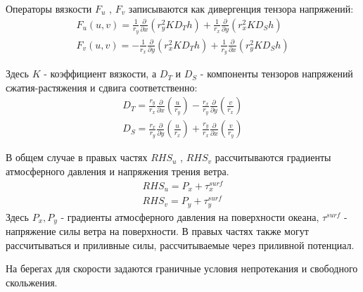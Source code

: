 Операторы вязкости $F_u$ , $F_v$ записываются как дивергенция тензора напряжений:
\begin{equation} \label{eq:ch1/sec1/3}
    \begin{array}{c}
        \displaystyle{F_{u} (u,v)=\frac{1}{r_{y} } \frac{\partial }{\partial x} \left(r_{y} ^{2} KD_{T} h\right)+\frac{1}{r_{x} } \frac{\partial }{\partial y} \left(r_{x} ^{2} KD_{S} h\right)} \\

        \displaystyle{F_{v} (u,v)=-\frac{1}{r_{x} } \frac{\partial }{\partial y} \left(r_{x} ^{2} KD_{T} h\right)+\frac{1}{r_{y} } \frac{\partial }{\partial x} \left(r_{y} ^{2} KD_{S} h\right)}
    \end{array}
\end{equation}

Здесь $\textit{K}$ - коэффициент вязкости, а $D_T$ и $D_S$ - компоненты тензоров напряжений сжатия-растяжения и сдвига соответственно:
\begin{equation} \label{eq:ch1/sec1/4}
    \begin{array}{c}
        \displaystyle{D_{T} =\frac{r_{y} }{r_{x} } \frac{\partial }{\partial x} \left(\frac{u}{r_{y} } \right)-\frac{r_{x} }{r_{y} } \frac{\partial }{\partial y} \left(\frac{v}{r_{x} } \right)} \\

        \displaystyle{D_{S} =\frac{r_{x} }{r_{y} } \frac{\partial }{\partial y} \left(\frac{u}{r_{x} } \right)+\frac{r_{y} }{r_{x} } \frac{\partial }{\partial x} \left(\frac{v}{r_{y} } \right)}
    \end{array}
\end{equation}

В общем случае в правых частях $RHS_u$ , $RHS_v$ рассчитываются градиенты атмосферного
давления и напряжения трения ветра. 
\begin{equation} \label{eq:ch1/sec1/5}
\begin{array}{c} 
\displaystyle{RHS_u = P_{x} + \tau _{x}^{surf}} \\ 

\displaystyle{RHS_v = P_{y} + \tau _{y}^{surf}} 
\end{array} 
\end{equation} 
Здесь $P_x, P_y$ - градиенты атмосферного давления на поверхности океана, $\tau^{surf}$ - напряжение силы ветра на поверхности.
В правых частях также могут рассчитываться и приливные силы,
рассчитываемые через приливной потенциал.

На берегах для скорости задаются граничные условия непротекания и свободного скольжения.

